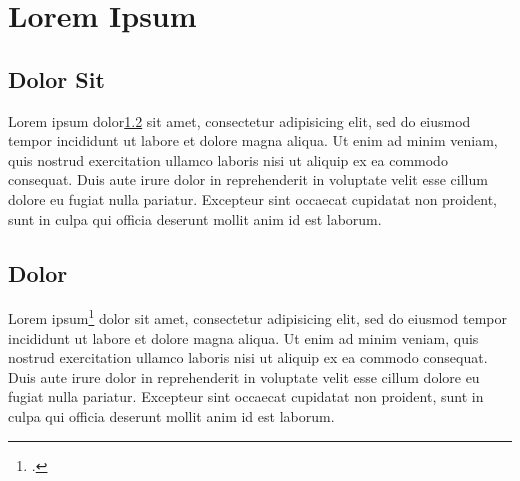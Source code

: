 
\section{Lorem Ipsum}
\subsection{Dolor Sit}
Lorem ipsum dolor\ref{dolor} sit amet, consectetur adipisicing elit, sed do eiusmod tempor incididunt ut labore et dolore magna aliqua. Ut enim ad minim veniam, quis nostrud exercitation ullamco laboris nisi ut aliquip ex ea commodo consequat. Duis aute irure dolor in reprehenderit in voluptate velit esse cillum dolore eu fugiat nulla pariatur. Excepteur sint occaecat cupidatat non proident, sunt in culpa qui officia deserunt mollit anim id est laborum.

\subsection{Dolor}\label{dolor}
Lorem\cite{knuth2016machine} ipsum\footcite{tkaczyk2015cermine} dolor sit amet, consectetur adipisicing elit, sed do eiusmod tempor incididunt ut labore et dolore magna aliqua. Ut enim ad minim veniam, quis nostrud exercitation ullamco laboris nisi ut aliquip ex ea commodo consequat. Duis aute irure dolor in reprehenderit in voluptate velit esse cillum dolore eu fugiat nulla pariatur. Excepteur sint occaecat cupidatat non proident, sunt in culpa qui officia deserunt mollit anim id est laborum.


